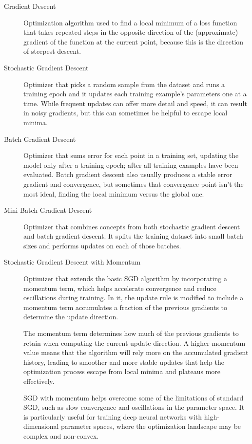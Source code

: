 \documentclass[a4paper]{report}
\begin{document}
\begin{description}
\item[Gradient Descent]
Optimization algorithm used to find a local minimum of a loss function that takes repeated steps in the opposite direction of the (approximate) gradient of the function at the current point, because this is the direction of steepest descent.

\item[Stochastic Gradient Descent]
Optimizer that picks a random sample from the dataset and runs a training epoch and it updates each training example's parameters one at a time. While frequent updates can offer more detail and speed, it can result in noisy gradients, but this can sometimes be helpful to escape local minima.

\item[Batch Gradient Descent]
Optimizer that sums error for each point in a training set, updating the model only after a training epoch; after all training examples have been evaluated. Batch gradient descent also usually produces a stable error gradient and convergence, but sometimes that convergence point isn't the most ideal, finding the local minimum versus the global one.

\item[Mini-Batch Gradient Descent]
Optimizer that combines concepts from both stochastic gradient descent and batch gradient descent. It splits the training dataset into small batch sizes and performs updates on each of those batches.

\item[Stochastic Gradient Descent with Momentum]
Optimizer that extends the basic SGD algorithm by incorporating a momentum term, which helps accelerate convergence and reduce oscillations during training. In it, the update rule is modified to include a momentum term accumulates a fraction of the previous gradients to determine the update direction. 

The momentum term determines how much of the previous gradients to retain when computing the current update direction. A higher momentum value means that the algorithm will rely more on the accumulated gradient history, leading to smoother and more stable updates that help the optimization process escape from local minima and plateaus more effectively.

SGD with momentum helps overcome some of the limitations of standard SGD, such as slow convergence and oscillations in the parameter space. It is particularly useful for training deep neural networks with high-dimensional parameter spaces, where the optimization landscape may be complex and non-convex.


\end{description}
\end{document}
